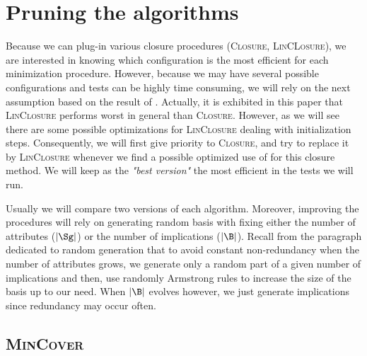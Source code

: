 \section{Pruning the algorithms}

Because we can plug-in various closure procedures (\textsc{Closure}, \textsc{LinCLosure}), we are interested in knowing which configuration is
the most efficient for each minimization procedure. However, because we may
have several possible configurations and tests can be highly time consuming,
we will rely on the next assumption based on the result of \cite{bazhanov_optimizations_2014}. Actually, it is exhibited in this paper
that \textsc{LinClosure} performs worst in general than \textsc{Closure}. However, as we will see there are some possible optimizations for \textsc{LinClosure} dealing with initialization steps. Consequently, 
we will first give priority to \textsc{Closure}, and try to replace it 
by \textsc{LinClosure} whenever we find a possible optimized use of 
for this closure method. We will keep as the \textit{"best version"} the most efficient in the tests we will run. 

\vspace{1.2em}

Usually we will compare two versions of each algorithm. Moreover, improving
the procedures will rely on generating random basis with fixing either the
number of attributes ($|\Sg|$) or the number of implications ($|\B|$). Recall from the paragraph dedicated to random generation that to avoid constant non-redundancy when the number of attributes grows, we generate only a random part of a given number of implications and then, use randomly Armstrong rules to increase the size of the basis up to our need. When $|\B|$ evolves however,
we just generate implications since redundancy may occur often.

\subsection{\textsc{MinCover}}

